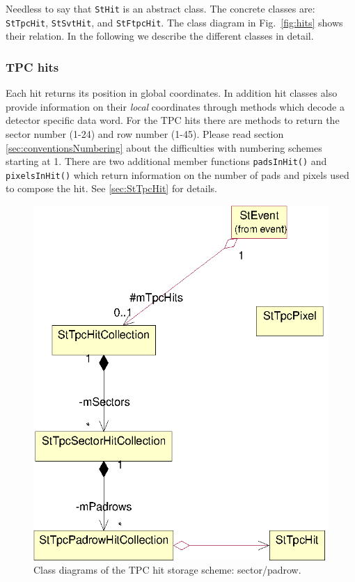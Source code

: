 \documentclass[twoside]{article}
\begin{document}
Needless to say that \texttt{StHit} is an abstract class. The concrete
classes are: \texttt{StTpcHit}, \texttt{StSvtHit}, and
\texttt{StFtpcHit}. The class diagram in Fig.~\ref{fig:hits} shows
their relation. In the following we describe the different classes in
detail.

\subsubsection{TPC hits}
  
  Each hit returns its position in global
coordinates. In addition hit classes also provide information on their
\emph{local} coordinates through methods which decode a detector
specific data word. For the TPC hits there are methods to return the
sector number (1-24) and row number (1-45).  Please read section
\ref{sec:conventionsNumbering} about the difficulties with numbering
schemes starting at 1.  There are two additional member functions
\texttt{padsInHit()} and \texttt{pixelsInHit()} which return
information on the number of pads and pixels used to compose the hit.
See \ref{sec:StTpcHit} for details.
\begin{figure}[htb]
    \begin{center}
        \includegraphics{tpc.eps}
        \caption{Class diagrams of the TPC hit storage scheme: sector/padrow.}
        \label{fig:tpc}
    \end{center}
\end{figure}
\end{document}
